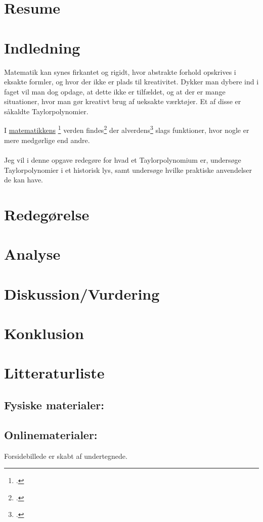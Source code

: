\documentclass[12pt, a4paper]{article}
\begin{document}
\section*{Resume} %
\blindtext[1-2]
\tableofcontents
\newpage



\section{Indledning} %
Matematik kan synes firkantet og rigidt, hvor abstrakte forhold opskrives i eksakte formler, og hvor der ikke er plads til kreativitet. 
Dykker man dybere ind i faget vil man dog opdage, at dette ikke er tilfældet, og at der er mange situationer, hvor man gør kreativt brug af ueksakte værktøjer. Et af disse er såkaldte Taylorpolynomier.


I \underline{matematikkens} \footcite[s. 23]{alsholm1} verden findes\footcite[s. 22]{alsholm1} der alverdens\footcite{calculuswithanalyticgeometry} slags funktioner, hvor nogle er mere medgørlige end andre.\\
\\
Jeg vil i denne opgave redegøre for hvad et Taylorpolynomium er, undersøge Taylorpolynomier i et historisk lys, samt undersøge hvilke praktiske anvendelser de kan have.

\section{Redegørelse} %

\section{Analyse} %

\section{Diskussion/Vurdering} %


\section{Konklusion} %

\section{Litteraturliste}
\nocite{*}
\subsection{Fysiske materialer:}
\printbibliography[keyword=bøger]
\subsection{Onlinematerialer:}
\printbibliography[keyword=online]
Forsidebillede er skabt af undertegnede.
\end{document}
